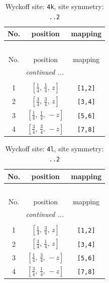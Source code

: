 \documentclass[fleqn,8pt]{jsarticle}
\begin{document}
\renewcommand{\arraystretch}{1.2}
\begin{longtable}{ccc}
\caption{Wyckoff site: {\tt 4k}, site symmetry: {\tt ..2}}
 \\
 \hline \hline
No. & position & mapping \\ \hline \endfirsthead

\multicolumn{2}{l}{\tablename\ \thetable{}} \\
 \hline \hline
No. & position & mapping \\ \hline \endhead

 \hline \hline
\multicolumn{2}{r}{\footnotesize\it continued ...} \\ \endfoot

 \hline \hline
\multicolumn{2}{r}{} \\ \endlastfoot

1 & $\left[ \frac{1}{4},\, \frac{1}{4},\, z \right]$ & {\tt [1,2]} \\ \hline
2 & $\left[ \frac{3}{4},\, \frac{3}{4},\, z \right]$ & {\tt [3,4]} \\ \hline
3 & $\left[ \frac{1}{4},\, \frac{1}{4},\, - z \right]$ & {\tt [5,6]} \\ \hline
4 & $\left[ \frac{3}{4},\, \frac{3}{4},\, - z \right]$ & {\tt [7,8]} \\
\end{longtable}
\renewcommand{\arraystretch}{1.2}
\begin{longtable}{ccc}
\caption{Wyckoff site: {\tt 4l}, site symmetry: {\tt ..2}}
 \\
 \hline \hline
No. & position & mapping \\ \hline \endfirsthead

\multicolumn{2}{l}{\tablename\ \thetable{}} \\
 \hline \hline
No. & position & mapping \\ \hline \endhead

 \hline \hline
\multicolumn{2}{r}{\footnotesize\it continued ...} \\ \endfoot

 \hline \hline
\multicolumn{2}{r}{} \\ \endlastfoot

1 & $\left[ \frac{1}{4},\, \frac{3}{4},\, z \right]$ & {\tt [1,2]} \\ \hline
2 & $\left[ \frac{3}{4},\, \frac{1}{4},\, z \right]$ & {\tt [3,4]} \\ \hline
3 & $\left[ \frac{1}{4},\, \frac{3}{4},\, - z \right]$ & {\tt [5,6]} \\ \hline
4 & $\left[ \frac{3}{4},\, \frac{1}{4},\, - z \right]$ & {\tt [7,8]} \\
\end{longtable}
\end{document}
